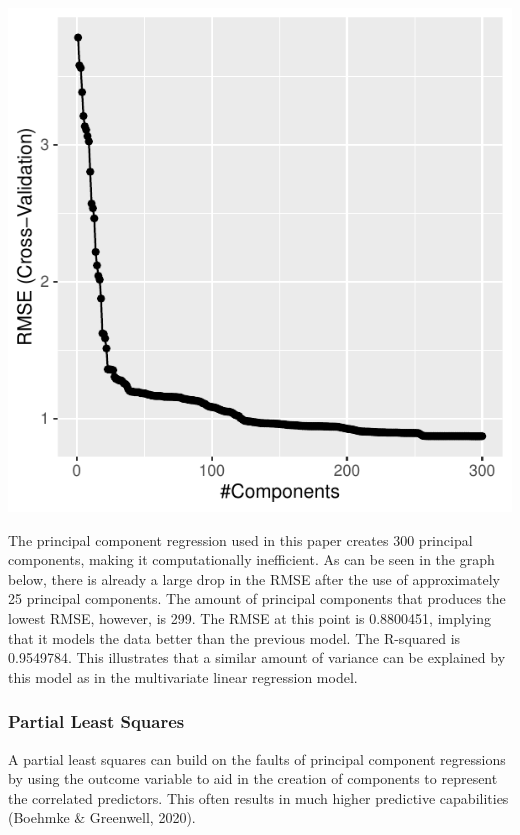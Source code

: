 \documentclass[11pt,preprint, authoryear]{elsarticle}
\numberwithin{equation}{section}
\numberwithin{figure}{section}
\numberwithin{table}{section}
\begin{document}
\begin{center}\includegraphics{MLPDF_files/figure-latex/unnamed-chunk-8-1} \end{center}

The principal component regression used in this paper creates 300
principal components, making it computationally inefficient. As can be
seen in the graph below, there is already a large drop in the RMSE after
the use of approximately 25 principal components. The amount of
principal components that produces the lowest RMSE, however, is 299. The
RMSE at this point is 0.8800451, implying that it models the data better
than the previous model. The R-squared is 0.9549784. This illustrates
that a similar amount of variance can be explained by this model as in
the multivariate linear regression model.

\hypertarget{partial-least-squares}{%
\subsubsection{Partial Least Squares}\label{partial-least-squares}}

A partial least squares can build on the faults of principal component
regressions by using the outcome variable to aid in the creation of
components to represent the correlated predictors. This often results in
much higher predictive capabilities (Boehmke \& Greenwell, 2020).
\end{document}

